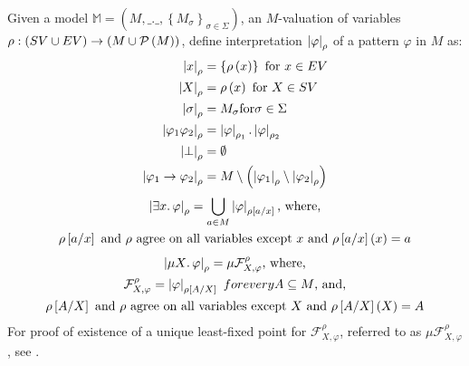 Given a model $\mathbb{M} = \left(M,\_.\_,\left\{M_{\sigma}\right\}_{\sigma \in
\Sigma}\right)$, an $M$-valuation of variables
$\rho:\left(SV{}\cup EV{}\right) \to \left(M \cup \mathcal{P}\left(M\right)\right)$, define
interpretation $\left|\varphi\right|_{\rho}$ of a pattern $\varphi$ in $M$ as:
\begin{align}
  \left|x\right|_{\rho} &= \left\{\rho\left(x\right)\right\} \text{ for }x \in EV \\
  \left|X\right|_{\rho} &= \rho\left(x\right) \text{ for } X \in SV \\
  \left|\sigma\right|_{\rho} &= M_{\sigma} \text{for} \sigma \in \Sigma \\
  \left|\varphi_1\varphi_2\right|_{\rho} &= \left|\varphi\right|_{\rho_1} . \left|\varphi\right|_{\rho_2} \\
  \left|\bot\right|_{\rho} &= \emptyset \\
  \left|\varphi_1 \to \varphi_2\right|_{\rho} &= M \setminus
    \left(\left|\varphi_1\right|_{\rho} \setminus \left|\varphi_2\right|_{\rho}\right)
\end{align}
\begin{equation}
  \begin{gathered}
  \left|\exists x \mathord{.\,} \varphi\right|_{\rho} = \bigcup_{a \in
    M}\left|\varphi\right|_{\rho\left[a / x\right]} \text{, where,} \\\rho\left[a / x\right] \text{ and }\rho \text{ agree on all
    variables except } x\text{ and } \rho\left[a / x\right](x) = a
  \end{gathered}
\end{equation}
\begin{equation}
  \begin{gathered}
  \left|\mu X \mathord{.\,} \varphi\right|_{\rho} = \mu\mathcal{F}^{\rho}_{X,\varphi} \text{, where,} \\
    \mathcal{F}^{\rho}_{X,\varphi} = \left|\varphi\right|_{\rho\left[A / X\right]} \text { for every } A \subseteq M \text{, and,} \\
    \rho\left[A / X\right] \text{ and } \rho \text{ agree on all variables except } X \text{ and } \rho\left[A / X\right](X) = A
  \end{gathered}
\end{equation}
\noindent For proof of existence of a unique least-fixed point for $\mathcal{F}^{\rho}_{X,\varphi}$, referred to as $\mu\mathcal{F}^{\rho}_{X,\varphi}$, see \cite{ChenLICS19}.

